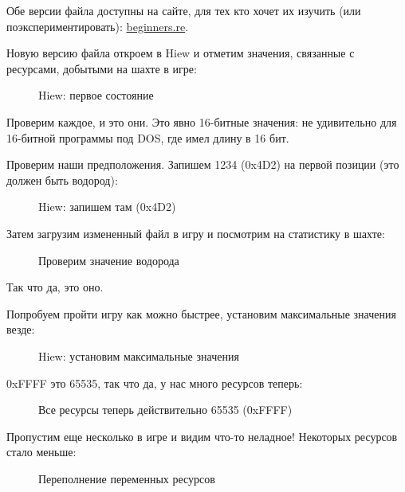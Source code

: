 Обе версии файла доступны на сайте, для тех кто хочет их изучить (или поэкспериментировать): 
\href{http://go.yurichev.com/17212}{beginners.re}.

\clearpage
Новую версию файла откроем в Hiew и отметим значения, связанные с ресурсами, добытыми на шахте в игре: 

\begin{figure}[H]
\centering
{}
\caption{Hiew: первое состояние}
\label{fig:mill_hiew3}
\end{figure}

Проверим каждое, и это они.
Это явно 16-битные значения: не удивительно для 16-битной программы под DOS, где \Tint имел длину в 16 бит.

\clearpage
Проверим наши предположения.
Запишем 1234 (0x4D2) на первой позиции (это должен быть водород):

\begin{figure}[H]
\centering
{}
\caption{Hiew: запишем там (0x4D2)}
\label{fig:mill_hiew4}
\end{figure}

Затем загрузим измененный файл в игру и посмотрим на статистику в шахте:

\begin{figure}[H]
\centering
{}
\caption{Проверим значение водорода}
\label{fig:mill_5}
\end{figure}

Так что да, это оно.

\clearpage
Попробуем пройти игру как можно быстрее, установим максимальные значения везде:

\begin{figure}[H]
\centering
{}
\caption{Hiew: установим максимальные значения}
\label{fig:mill_hiew7}
\end{figure}

0xFFFF это 65535, так что да, у нас много ресурсов теперь:

\begin{figure}[H]
\centering
{}
\caption{Все ресурсы теперь действительно 65535 (0xFFFF)}
\label{fig:mill_6}
\end{figure}

\clearpage
Пропустим еще несколько  в игре и видим что-то неладное! 
Некоторых ресурсов стало меньше:

\begin{figure}[H]
\centering
{}
\caption{Переполнение переменных ресурсов}
\label{fig:mill_8}
\end{figure}

